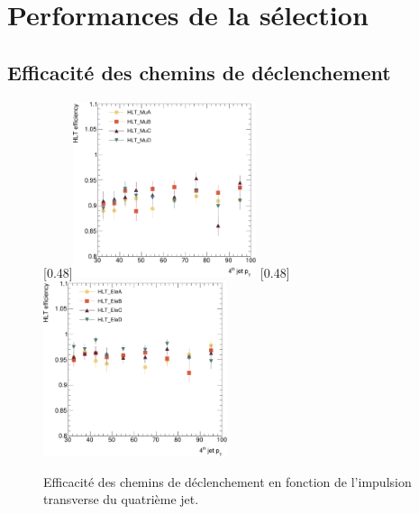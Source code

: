 \section{Performances de la sélection}

\subsection{Efficacité des chemins de déclenchement} \label{sec:zp_eff_hlt}

\begin{figure}[tbp] \centering
    [0.48\textwidth]{\includegraphics[width=0.48\textwidth]{chapitre7/figs/HLT/HLTturnon_mu_fourthJet_zoom.pdf}}
    [0.48\textwidth]{\includegraphics[width=0.48\textwidth]{chapitre7/figs/HLT/HLTturnon_el_fourthJet_zoom.pdf}}
    \caption{Efficacité des chemins de déclenchement en fonction de l'impulsion transverse du quatrième jet.}
    \label{fig:trig_eff}
\end{figure}


